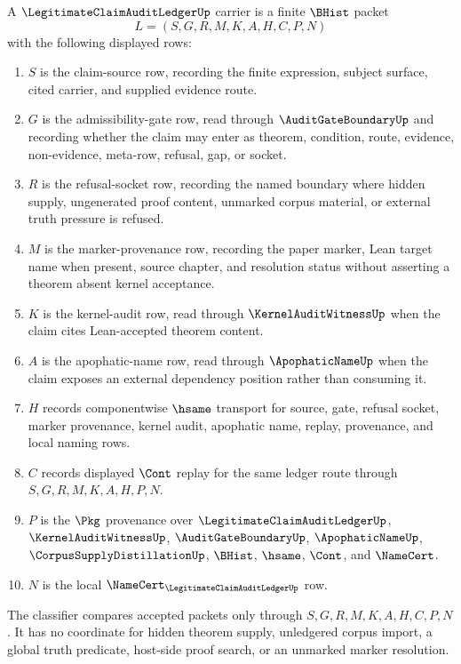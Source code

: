 \begin{definition}
\label{def:legitimate-claim-audit-ledger-carrier}
A $\LegitimateClaimAuditLedgerUp$ carrier is a finite $\BHist$ packet
$$
L=(S,G,R,M,K,A,H,C,P,N)
$$
with the following displayed rows:
\begin{enumerate}
\item $S$ is the claim-source row, recording the finite expression, subject surface, cited carrier, and supplied evidence route.
\item $G$ is the admissibility-gate row, read through $\AuditGateBoundaryUp$ and recording whether the claim may enter as theorem, condition, route, evidence, non-evidence, meta-row, refusal, gap, or socket.
\item $R$ is the refusal-socket row, recording the named boundary where hidden supply, ungenerated proof content, unmarked corpus material, or external truth pressure is refused.
\item $M$ is the marker-provenance row, recording the paper marker, Lean target name when present, source chapter, and resolution status without asserting a theorem absent kernel acceptance.
\item $K$ is the kernel-audit row, read through $\KernelAuditWitnessUp$ when the claim cites Lean-accepted theorem content.
\item $A$ is the apophatic-name row, read through $\ApophaticNameUp$ when the claim exposes an external dependency position rather than consuming it.
\item $H$ records componentwise $\hsame$ transport for source, gate, refusal socket, marker provenance, kernel audit, apophatic name, replay, provenance, and local naming rows.
\item $C$ records displayed $\Cont$ replay for the same ledger route through $S,G,R,M,K,A,H,P,N$.
\item $P$ is the $\Pkg$ provenance over $\LegitimateClaimAuditLedgerUp$, $\KernelAuditWitnessUp$, $\AuditGateBoundaryUp$, $\ApophaticNameUp$, $\CorpusSupplyDistillationUp$, $\BHist$, $\hsame$, $\Cont$, and $\NameCert$.
\item $N$ is the local $\NameCert_{\LegitimateClaimAuditLedgerUp}$ row.
\end{enumerate}
The classifier compares accepted packets only through $S,G,R,M,K,A,H,C,P,N$. It has no coordinate for hidden theorem supply, unledgered corpus import, a global truth predicate, host-side proof search, or an unmarked marker resolution.
\end{definition}

